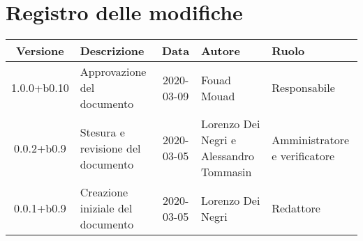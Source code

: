 \section*{Registro delle modifiche}

\begin{center}
	\begin{longtable}{|c|p{3.5cm}|c|p{3cm}|p{3cm}|}
	\hline
	\rowcolor{lighter-grayer}
	\textbf{Versione} & \textbf{Descrizione} & \textbf{Data} & \textbf{Autore} & \textbf{Ruolo} \\
	\hline
	\endfirsthead


	1.0.0+b0.10 & Approvazione del documento & 2020-03-09 & Fouad Mouad & Responsabile \\
	\hline
	0.0.2+b0.9 & Stesura e revisione del documento & 2020-03-05 & Lorenzo Dei Negri e Alessandro Tommasin & Amministratore e verificatore \\
	\hline
	0.0.1+b0.9 & Creazione iniziale del documento & 2020-03-05 & Lorenzo Dei Negri & Redattore \\
	\hline

	\end{longtable}
\end{center}